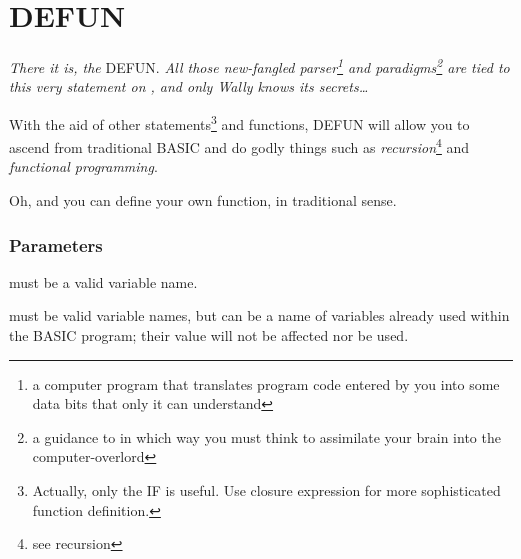 \section{DEFUN}

\emph{There it is, the} DEFUN. \emph{All those new-fangled parser\footnote{a computer program that translates program code entered by you into some data bits that only it can understand} and paradigms\footnote{a guidance to in which way you must think to assimilate your brain into the computer-overlord} are tied to this very statement on \tbas, and only Wally knows its secrets\ldots}


With the aid of other statements\footnote{Actually, only the IF is useful. Use closure expression for more sophisticated function definition.} and functions, DEFUN will allow you to ascend from traditional BASIC and do godly things such as \emph{recursion}\footnote{see recursion} and \emph{functional programming}.

Oh, and you can define your own function, in traditional  sense.

\subsubsection*{Parameters}

\begin{itemlist}
\item {} must be a valid variable name.
\item {} must be valid variable names, but can be a name of variables already used within the BASIC program; their value will not be affected nor be used.
\end{itemlist}
